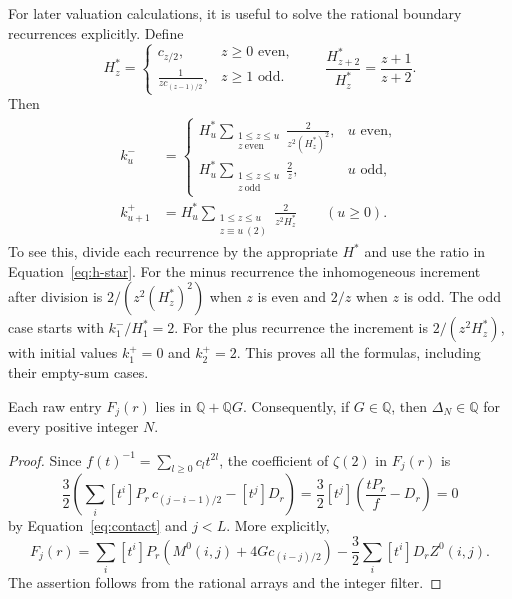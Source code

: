 For later valuation calculations, it is useful to solve the rational
boundary recurrences explicitly. Define
\begin{equation}\label{eq:h-star}
H_z^*=\begin{cases}
c_{z/2},&z\ge0\text{ even},\\
\displaystyle\frac{1}{z c_{(z-1)/2}},&z\ge1\text{ odd}.
\end{cases}
\qquad\frac{H_{z+2}^*}{H_z^*}=\frac{z+1}{z+2}.
\end{equation}
Then
\begin{equation}\label{eq:explicit-boundary-arrays}
\begin{split}
k^-_u&=\begin{cases}
\displaystyle H_u^*\sum_{\substack{1\le z\le u\\z\ \text{even}}}
            \frac{2}{z^2(H_z^*)^2},&u\text{ even},\\[6pt]
\displaystyle H_u^*\sum_{\substack{1\le z\le u\\z\ \text{odd}}}
            \frac{2}{z},&u\text{ odd},
\end{cases}\\
k^+_{u+1}&=H_u^*\sum_{\substack{1\le z\le u\\z\equiv u\ (2)}}
                 \frac{2}{z^2H_z^*}\qquad(u\ge0).
\end{split}
\end{equation}
To see this, divide each recurrence by the appropriate $H^*$ and use
the ratio in Equation~\eqref{eq:h-star}. For the minus recurrence the
inhomogeneous increment after division is $2/(z^2(H_z^*)^2)$ when
$z$ is even and $2/z$ when $z$ is odd. The odd case starts with
$k^-_1/H_1^*=2$. For the plus recurrence the increment is
$2/(z^2H_z^*)$, with initial values $k^+_1=0$ and $k^+_2=2$.
This proves all the formulas, including their empty-sum cases.

\begin{proposition}\label{prop:rationality}
Each raw entry $F_j(r)$ lies in $\mathbb Q+\mathbb QG$.
Consequently, if $G\in\mathbb Q$, then $\Delta_N\in\mathbb Q$ for
every positive integer $N$.
\end{proposition}
\begin{proof}
Since $f(t)^{-1}=\sum_{l\ge0}c_l t^{2l}$, the coefficient of
$\zeta(2)$ in $F_j(r)$ is
\[
\frac32\left(\sum_i[t^i]P_r\,c_{(j-i-1)/2}-[t^j]D_r\right)
=\frac32[t^j]\left(\frac{tP_r}{f}-D_r\right)=0
\]
by Equation~\eqref{eq:contact} and $j<L$. More explicitly,
\begin{equation}\label{eq:rational-raw-entry}
F_j(r)=\sum_i[t^i]P_r
       \left(M^0(i,j)+4G c_{(i-j)/2}\right)
       -\frac32\sum_i[t^i]D_r Z^0(i,j).
\end{equation}
The assertion follows from the rational arrays and the integer filter.
\end{proof}

